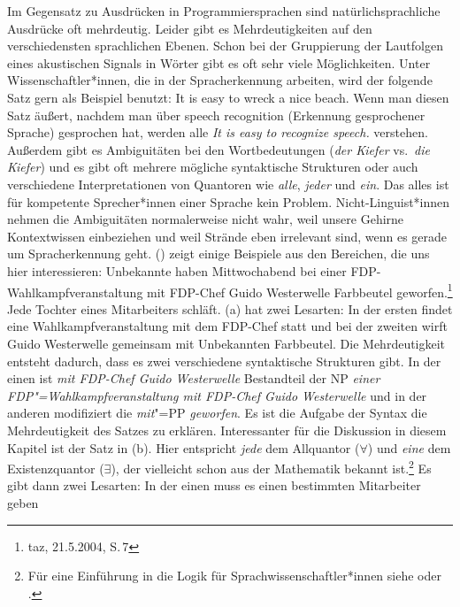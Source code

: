 Im Gegensatz zu Ausdrücken in Programmiersprachen sind natürlichsprachliche Ausdrücke oft
mehrdeutig. Leider gibt es Mehrdeutigkeiten auf den verschiedensten sprachlichen Ebenen. Schon bei der Gruppierung der
Lautfolgen eines akustischen Signals in Wörter gibt es oft sehr viele
Möglichkeiten. Unter Wissenschaftler*innen, die in der Spracherkennung arbeiten, wird der folgende
Satz gern als Beispiel benutzt:
\ea
It is easy to wreck a nice beach.
\z
Wenn man diesen Satz äußert, nachdem man über speech recognition (Erkennung gesprochener Sprache)
gesprochen hat, werden alle \emph{It is easy to recognize speech.} verstehen. Außerdem gibt es
Ambiguitäten bei den Wortbedeutungen (\emph{der Kiefer} vs.\ \emph{die Kiefer}) und es gibt oft
mehrere mögliche syntaktische Strukturen oder auch verschiedene Interpretationen von Quantoren wie
\emph{alle}, \emph{jeder} und \emph{ein}. Das alles ist für kompetente Sprecher*innen einer Sprache
kein Problem. Nicht-Linguist*innen nehmen die Ambiguitäten normalerweise nicht wahr, weil unsere
Gehirne Kontextwissen einbeziehen und weil Strände eben irrelevant sind, wenn es gerade um
Spracherkennung geht. %
() zeigt einige Beispiele aus den Bereichen, die uns hier interessieren:
\eal
\ex Unbekannte haben Mittwochabend bei einer %
FDP-Wahlkampfveranstaltung mit FDP-Chef Guido Westerwelle Farbbeutel geworfen.\footnote{
taz, 21.5.2004, S.\,7
}
\ex
\label{ex-Jede-Tochter-eines-Mitarbeiters-schläft}
Jede Tochter eines Mitarbeiters schläft.
\zl 
(a) hat zwei Lesarten: In der ersten findet eine Wahlkampfveranstaltung mit dem FDP-Chef
statt und bei der zweiten wirft Guido Westerwelle gemeinsam mit Unbekannten Farbbeutel. Die
Mehrdeutigkeit entsteht dadurch, dass es zwei verschiedene syntaktische Strukturen gibt. In der einen ist
\emph{mit FDP-Chef Guido Westerwelle} Bestandteil der NP \emph{einer FDP"=Wahlkampfveranstaltung mit
  FDP-Chef Guido Westerwelle} und in der anderen modifiziert die \emph{mit}"=PP \emph{geworfen}.
Es ist die Aufgabe der Syntax die Mehrdeutigkeit des Satzes zu erklären. Interessanter für die
Diskussion in diesem Kapitel ist der Satz in (b). Hier entspricht \emph{jede} dem Allquantor ($\forall$) und \emph{eine} dem
Existenzquantor ($\exists$), der vielleicht schon aus der Mathematik bekannt ist.\footnote{%
Für eine Einführung in die Logik für Sprachwissenschaftler*innen siehe  oder .}
Es gibt dann zwei Lesarten: In der einen muss es einen bestimmten Mitarbeiter geben
